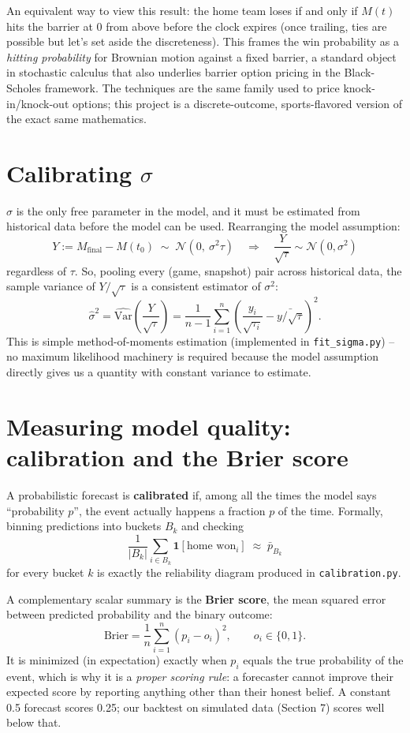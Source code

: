 \documentclass[11pt]{article}
\begin{document}
An equivalent way to view this result: the home team loses if and only if
$M(t)$ hits the barrier at $0$ from above before the clock expires (once
trailing, ties are possible but let's set aside the discreteness). This
frames the win probability as a \emph{hitting probability} for Brownian
motion against a fixed barrier, a standard object in stochastic calculus
that also underlies barrier option pricing in the Black-Scholes framework.
The techniques are the same family used to price knock-in/knock-out
options; this project is a discrete-outcome, sports-flavored version of
the exact same mathematics.

\section{Calibrating $\sigma$}

$\sigma$ is the only free parameter in the model, and it must be estimated
from historical data before the model can be used. Rearranging the model
assumption:
\[
Y := M_{\text{final}} - M(t_0) \;\sim\; \mathcal{N}(0,\ \sigma^2 \tau)
\quad\Longrightarrow\quad
\frac{Y}{\sqrt{\tau}} \sim \mathcal{N}(0, \sigma^2)
\]
regardless of $\tau$. So, pooling every (game, snapshot) pair across
historical data, the sample variance of $Y/\sqrt{\tau}$ is a consistent
estimator of $\sigma^2$:
\[
\hat{\sigma}^2 = \widehat{\mathrm{Var}}\!\left(\frac{Y}{\sqrt{\tau}}\right)
= \frac{1}{n-1}\sum_{i=1}^n \left(\frac{y_i}{\sqrt{\tau_i}} - \bar{y/\sqrt{\tau}}\right)^2.
\]
This is simple method-of-moments estimation (implemented in
\texttt{fit\_sigma.py}) -- no maximum likelihood machinery is required
because the model assumption directly gives us a quantity with constant
variance to estimate.

\section{Measuring model quality: calibration and the Brier score}

A probabilistic forecast is \textbf{calibrated} if, among all the times the
model says ``probability $p$'', the event actually happens a fraction $p$
of the time. Formally, binning predictions into buckets $B_k$ and checking
\[
\frac{1}{|B_k|}\sum_{i \in B_k} \mathbf{1}[\text{home won}_i] \;\approx\; \bar{p}_{B_k}
\]
for every bucket $k$ is exactly the reliability diagram produced in
\texttt{calibration.py}.

A complementary scalar summary is the \textbf{Brier score}, the mean
squared error between predicted probability and the binary outcome:
\[
\text{Brier} = \frac{1}{n}\sum_{i=1}^n (p_i - o_i)^2, \qquad o_i \in \{0,1\}.
\]
It is minimized (in expectation) exactly when $p_i$ equals the true
probability of the event, which is why it is a \emph{proper scoring rule}:
a forecaster cannot improve their expected score by reporting anything
other than their honest belief. A constant 0.5 forecast scores 0.25; our
backtest on simulated data (Section 7) scores well below that.
\end{document}
